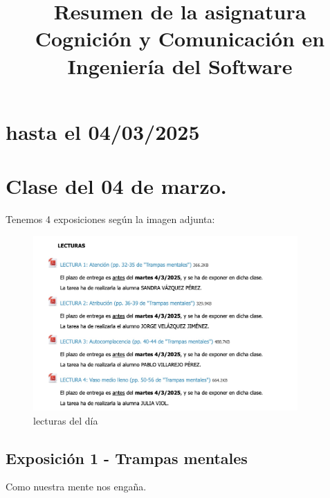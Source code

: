 \documentclass[12pt, a4paper, twoside]{article}
\title{Resumen de la asignatura Cognición y Comunicación en Ingeniería del Software}
\begin{document}
\maketitle

\section{hasta el 04/03/2025}

\section{Clase del 04 de marzo.}
Tenemos 4 exposiciones según la imagen adjunta:
\begin{figure}[h]
    \centering
    \includegraphics[width=0.9\textwidth]{./Images/0304.jpg}
    \caption{lecturas del día}
\end{figure}

\subsection{Exposición 1 - Trampas mentales}
Como nuestra mente nos engaña. \\
\end{document}
